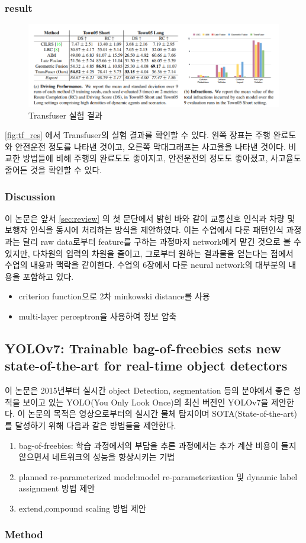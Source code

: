 \subsubsection{result}
\begin{figure}[htp]
    \centering
    \includegraphics[width=\linewidth]{figures/Transfuser_result.png}
    \caption{Transfuser 실험 결과}
    \label{fig:tf_res}
\end{figure}
\autoref{fig:tf_res} 에서 Transfuser의 실험 결과를 확인할 수 있다.
왼쪽 장표는 주행 완료도와 안전운전 정도를 나타낸 것이고,
오른쪽 막대그래프는 사고율을 나타낸 것이다.
비교한 방법들에 비해 주행의 완료도도 좋아지고,
안전운전의 정도도 좋아졌고,
사고율도 줄어든 것을 확인할 수 있다.

\subsubsection{Discussion}
이 논문은 앞서 \autoref{sec:review} 의 첫 문단에서 밝힌 바와 같이
교통신호 인식과 차량 및 보행자 인식을 동시에 처리하는 방식을 제안하였다.
이는 수업에서 다룬 패턴인식 과정과는 달리 raw data로부터 feature를 구하는 과정마저
network에게 맡긴 것으로 볼 수 있지만, 다차원의 입력의 차원을 줄이고,
그로부터 원하는 결과물을 얻는다는 점에서 수업의 내용과 맥락을 같이한다.
수업의 6장에서 다룬 neural network의 대부분의 내용을 포함하고 있다.
\begin{itemize}\tightlist
    \item criterion function으로 2차 minkowski distance를 사용
    \item multi-layer perceptron을 사용하여 정보 압축
\end{itemize}


\subsection{YOLOv7: Trainable bag-of-freebies sets new state-of-the-art for real-time object detectors}{\label{subsec:yolov7}}
이 논문은 2015년부터 실시간 object Detection, segmentation 등의 분야에서 좋은 성적을 보이고 있는
YOLO(You Only Look Once)의 최신 버전인 YOLOv7을 제안한다.
이 논문의 목적은 영상으로부터의 실시간 물체 탐지이며 SOTA(State-of-the-art)를 달성하기 위해 다음과 같은 방법들을 제안한다.
 \begin{enumerate}\tightlist
    \item bag-of-freebies: 학습 과정에서의 부담을 추론 과정에서는 추가 계산 비용이 들지 않으면서 네트워크의 성능을 향상시키는 기법
    \item planned re-parameterized model:model re-parameterization 및 dynamic label assignment 방법 제안
    \item extend,compound scaling 방법 제안
\end{enumerate}

\subsubsection{Method}{\label{subsubsec:yolov7_method}}

